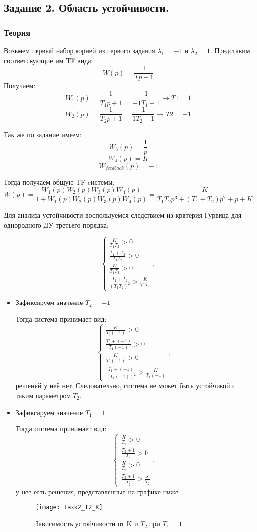 \documentclass[16pt]{article}
\begin{document}
\newpage
\subsection{Задание 2. Область устойчивости. }
\subsubsection{Теория}
Возьмем первый набор корней из первого задания \(\lambda_1 = -1\) и \(\lambda_2 = 1\).
Представим соответсвующие им TF вида:
\[W(p) = \frac{1}{Tp + 1}\]
Получаем:
\[W_1(p) = \frac{1}{T_1p + 1} = \frac{1}{-1T_1 + 1} \rightarrow T1 = 1\]
\[W_2(p) = \frac{1}{T_2p + 1} = \frac{1}{1T_2 + 1} \rightarrow T2 = -1\]

Так же по задание имеем:
\[W_3(p) = \frac{1}{p}\]
\[W_4(p) = K\]
\[W_{feedback}(p) = -1\]

Тогда получаем общую TF cистемы:
\[W(p) = \frac{W_1(p)W_2(p)W_3(p)W_4(p)}{1 + W_1(p)W_2(p)W_3(p)W_4(p)} = \frac{K}{T_1T_2p^3 + (T_1+T_2)p^2+p+K}\]

Для анализа устойчивости воспользуемся следствием из критерия Гурвица для однородного ДУ третьего порядка:

\[
    \begin{cases}
        \frac{K}{T_1T_2} > 0 \\
        \frac{T_1+T_2}{T_1T_2} > 0\\ 
        \frac{K}{T_1T_2} > 0\\ 
        \frac{T_1+T_2}{(T_1T_2)^2} > \frac{K}{T_1T_2}
    \end{cases},
\]

\begin{itemize}
    \item Зафиксируем значение \(T_2 = -1\)
    
    Тогда система принимает вид: 
    \[
    \begin{cases}
        \frac{K}{T_1(-1)} > 0 \\
        \frac{T_1+(-1)}{T_1(-1)} > 0\\ 
        \frac{K}{T_1(-1)} > 0\\ 
        \frac{T_1+(-1)}{(T_1(-1))^2} > \frac{K}{T_1(-1)}
    \end{cases},
    \]
    решений у неё нет. Следовательно, система не может быть устойчивой с таким параметром \(T_2\).

    \item Зафиксируем значение \(T_1 = 1\)
    
    Тогда система принимает вид: 
    \[
    \begin{cases}
        \frac{K}{T_2} > 0 \\
        \frac{T_2+1}{T_2} > 0\\ 
        \frac{K}{T_2} > 0\\ 
        \frac{T_2+1}{T_2^2} > \frac{K}{T_2}
    \end{cases},
    \]
    у нее есть решения, представленные на графике ниже.
    \begin{figure}[H]
        \centering
        \texttt{[image: task2\_T2\_K]}
        \caption{Зависимость устойчивости от K и \(T_2\) при \(T_1 = 1\) .}
        \label{fig:fig4}
    \end{figure}
\end{itemize}
\newpage
\end{document}
